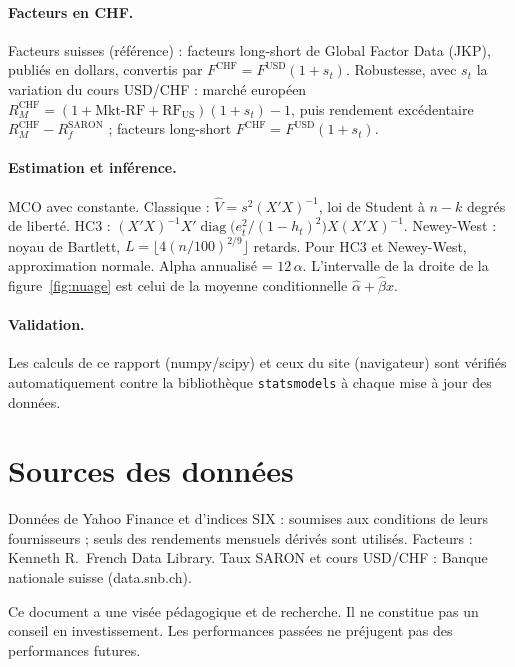 \documentclass[11pt,a4paper]{article}
\begin{document}
\paragraph{Facteurs en CHF.} Facteurs suisses (référence) : facteurs long-short de Global Factor Data (JKP), publiés en dollars, convertis par $F^{\text{CHF}} = F^{\text{USD}}(1 + s_t)$. Robustesse, avec $s_t$ la variation du cours USD/CHF : marché européen $R^{\text{CHF}}_M = (1 + \text{Mkt-RF} + \text{RF}_{\text{US}})(1 + s_t) - 1$, puis rendement excédentaire $R^{\text{CHF}}_M - R_f^{\text{SARON}}$ ; facteurs long-short $F^{\text{CHF}} = F^{\text{USD}}(1 + s_t)$.

\paragraph{Estimation et inférence.} MCO avec constante. Classique : $\hat V = s^2 (X'X)^{-1}$, loi de Student à $n-k$ degrés de liberté. HC3 : $(X'X)^{-1} X' \operatorname{diag}\!\big(e_t^2/(1-h_t)^2\big) X (X'X)^{-1}$. Newey-West : noyau de Bartlett, $L = \lfloor 4 (n/100)^{2/9} \rfloor$ retards. Pour HC3 et Newey-West, approximation normale. Alpha annualisé = $12\,\alpha$. L'intervalle de la droite de la figure~\ref{fig:nuage} est celui de la moyenne conditionnelle $\hat\alpha + \hat\beta x$.

\paragraph{Validation.} Les calculs de ce rapport (numpy/scipy) et ceux du site (navigateur) sont vérifiés automatiquement contre la bibliothèque \texttt{statsmodels} à chaque mise à jour des données.

\section{Sources des données}

\begin{center}\small

\end{center}

Données de Yahoo Finance et d'indices SIX : soumises aux conditions de leurs fournisseurs ; seuls des rendements mensuels dérivés sont utilisés. Facteurs : Kenneth R.~French Data Library. Taux SARON et cours USD/CHF : Banque nationale suisse (data.snb.ch).

\vfill
{\small\color{gris} Ce document a une visée pédagogique et de recherche. Il ne constitue pas un conseil en investissement. Les performances passées ne préjugent pas des performances futures.}
\end{document}
